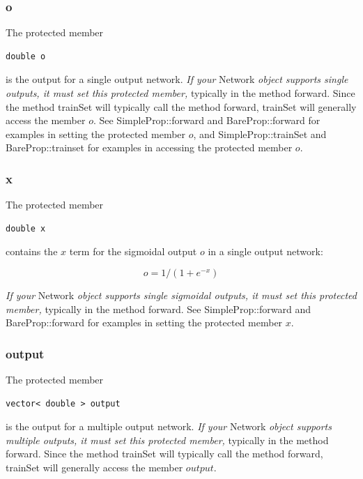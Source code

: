 \documentclass{report}
\begin{document}
\subsubsection{o}

The protected member

\begin{verbatim}
double o
\end{verbatim}

is the output for a single output network.  {\em If your} Network {\em
object supports single outputs, it must set this protected member,}
typically in the method forward.
Since the method trainSet will typically call the method forward,
trainSet will generally access the member $o$.  See
SimpleProp::forward and BareProp::forward for examples in setting the
protected member $o$, and SimpleProp::trainSet and BareProp::trainset
for examples in accessing the protected member $o$.

\subsubsection{x}

The protected member

\begin{verbatim}
double x
\end{verbatim}

contains the $x$ term for the sigmoidal output $o$ in a single output
network:

\begin{displaymath}
o = 1/(1+e^{-x})
\end{displaymath}

{\em If your} Network {\em object supports single sigmoidal outputs,
it must set this protected member,} typically in the method forward.
 See SimpleProp::forward and
BareProp::forward for examples in setting the protected member $x$.

\subsubsection{output}

The protected member

\begin{verbatim}
vector< double > output
\end{verbatim}

is the output for a multiple output network.  {\em If your} Network
{\em object supports multiple outputs, it must set this protected
member,} typically in the method forward.
Since the method trainSet will typically call the method forward,
trainSet will generally access the member $output$.
\end{document}
